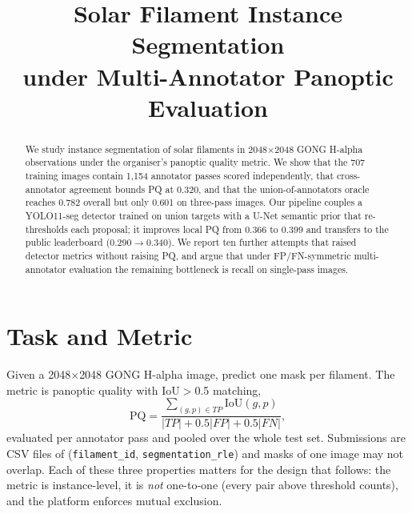 \documentclass[conference]{IEEEtran}
\title{Solar Filament Instance Segmentation\\under Multi-Annotator Panoptic Evaluation}
\author{\IEEEauthorblockN{Anonymous Participant}\IEEEauthorblockA{IEEE BigData Cup 2026 -- Solar Filament Segmentation}}
\begin{document}
\maketitle
\begin{abstract}
We study instance segmentation of solar filaments in 2048$\times$2048 GONG H-alpha observations under the organiser's panoptic quality metric. We show that the 707 training images contain 1{,}154 annotator passes scored independently, that cross-annotator agreement bounds PQ at 0.320, and that the union-of-annotators oracle reaches 0.782 overall but only 0.601 on three-pass images. Our pipeline couples a YOLO11-seg detector trained on union targets with a U-Net semantic prior that re-thresholds each proposal; it improves local PQ from 0.366 to 0.399 and transfers to the public leaderboard (0.290$\rightarrow$0.340). We report ten further attempts that raised detector metrics without raising PQ, and argue that under FP/FN-symmetric multi-annotator evaluation the remaining bottleneck is recall on single-pass images.
\end{abstract}
\section{Task and Metric}
Given a 2048$\times$2048 GONG H-alpha image, predict one mask per filament. The metric is panoptic quality with IoU$>$0.5 matching,
\begin{equation}
\mathrm{PQ}=\frac{\sum_{(g,p)\in TP}\mathrm{IoU}(g,p)}{|TP|+0.5|FP|+0.5|FN|},
\end{equation}
evaluated per annotator pass and pooled over the whole test set. Submissions are CSV files of (\texttt{filament\_id}, \texttt{segmentation\_rle}) and masks of one image may not overlap. Each of these three properties matters for the design that follows: the metric is instance-level, it is \emph{not} one-to-one (every pair above threshold counts), and the platform enforces mutual exclusion.
\end{document}
